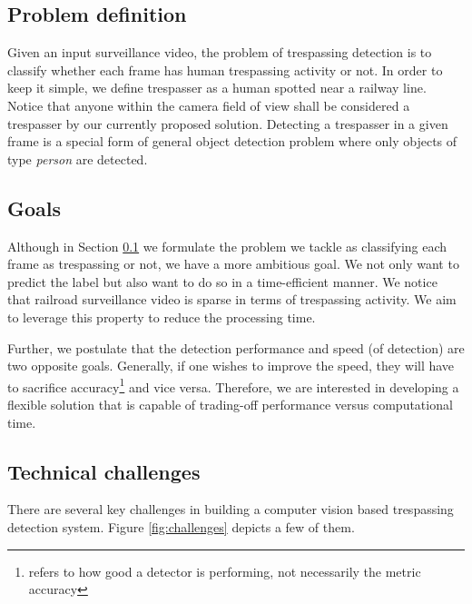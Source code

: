 \subsection{Problem definition}
\label{sec:problem-definition}
Given an input surveillance video, the problem of trespassing detection is to classify whether each frame has  human trespassing activity or not. In order to keep it simple, we define trespasser as a human spotted near a railway line. Notice that anyone within the camera field of view shall be considered a trespasser by our currently proposed solution. Detecting a trespasser in a given frame is a special form of general object detection problem where only objects of type \textit{person} are detected.

\subsection{Goals}
\label{sec:goal}
Although in Section \ref{sec:problem-definition} we formulate the problem we tackle as classifying each frame as trespassing or not, we have a more ambitious goal. We not only want to predict the label but also want to do so in a time-efficient manner. We notice that railroad surveillance video is sparse in terms of trespassing activity. We aim to leverage this property to reduce the processing time.  

Further, we postulate that the detection performance and speed (of detection) are two opposite goals. Generally, if one wishes to improve the speed, they will have to sacrifice accuracy\footnote{refers to how good a detector is performing, not necessarily the metric accuracy} and vice versa. Therefore, we are interested in developing a flexible solution that is capable of trading-off performance versus computational time. 



\subsection{Technical challenges}
\label{sec:challenges}
There are several key challenges in building a computer vision based trespassing detection system. Figure \ref{fig:challenges} depicts a few of them. 

